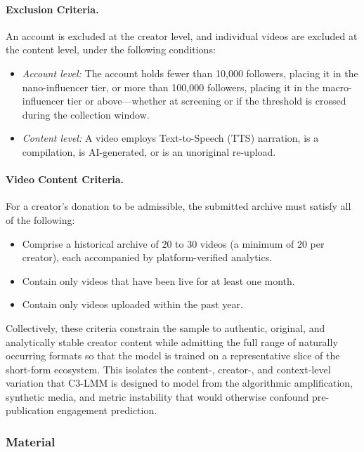 \paragraph{Exclusion Criteria.} An account is excluded at the creator level, and individual videos are excluded at the content level, under the following conditions:
\begin{itemize}
    \item \textit{Account level:} The account holds fewer than 10{,}000 followers, placing it in the nano-influencer tier, or more than 100{,}000 followers, placing it in the macro-influencer tier or above---whether at screening or if the threshold is crossed during the collection window.

    \item \textit{Content level:} A video employs Text-to-Speech (TTS) narration, is a compilation, is AI-generated, or is an unoriginal re-upload.
\end{itemize}

\paragraph{Video Content Criteria.} For a creator's donation to be admissible, the submitted archive must satisfy all of the following:
\begin{itemize}
    \item Comprise a historical archive of 20 to 30 videos (a minimum of 20 per
    creator), each accompanied by platform-verified analytics.

    \item Contain only videos that have been live for at least one month.

    \item Contain only videos uploaded within the past year.
\end{itemize}

Collectively, these criteria constrain the sample to authentic, original, and analytically stable creator content while admitting the full range of naturally occurring formats so that the model is trained on a representative slice of the short-form ecosystem. This isolates the content-, creator-, and context-level variation that C3-LMM is designed to model from the algorithmic amplification, synthetic media, and metric instability that would otherwise confound pre-publication engagement prediction.

\subsubsection{Material}

